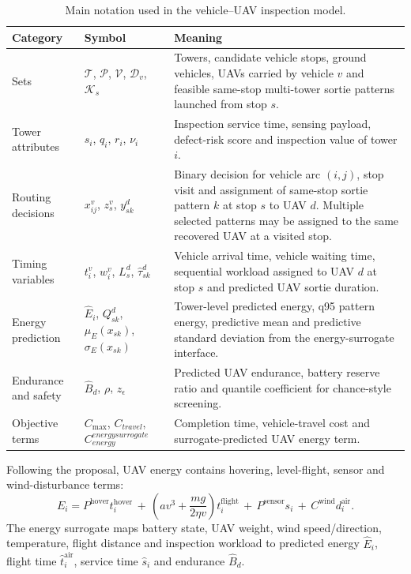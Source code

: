 \documentclass[preprint,12pt,number]{elsarticle}
\newcommand{\rev}[1]{{\color{blue}#1}}
\begin{document}
\begin{table}[t]
\centering
\caption{Main notation used in the vehicle--UAV inspection model.}
\label{tab:notation}
{\scriptsize
\setlength{\tabcolsep}{3pt}
\renewcommand{\arraystretch}{0.95}
\begin{tabularx}{\textwidth}{@{}llX@{}}
\toprule
Category & Symbol & Meaning \\
\midrule
Sets & $\mathcal{T}$, $\mathcal{P}$, $\mathcal{V}$, $\mathcal{D}_v$, $\mathcal{K}_s$ & \rev{Towers, candidate vehicle stops, ground vehicles, UAVs carried by vehicle $v$ and feasible same-stop multi-tower sortie patterns launched from stop $s$.} \\
Tower attributes & $s_i$, $q_i$, $r_i$, $\nu_i$ & Inspection service time, sensing payload, defect-risk score and inspection value of tower $i$. \\
Routing decisions & $x^v_{ij}$, $z_s^v$, $y^d_{sk}$ & \rev{Binary decision for vehicle arc $(i,j)$, stop visit and assignment of same-stop sortie pattern $k$ at stop $s$ to UAV $d$. Multiple selected patterns may be assigned to the same recovered UAV at a visited stop.} \\
Timing variables & $t_i^v$, $w_i^v$, $L_s^d$, $\hat\tau^d_{sk}$ & \rev{Vehicle arrival time, vehicle waiting time, sequential workload assigned to UAV $d$ at stop $s$ and predicted UAV sortie duration.} \\
Energy prediction & $\hat E_i$, $Q^d_{sk}$, $\mu_E(x_{sk})$, $\sigma_E(x_{sk})$ & \rev{Tower-level predicted energy, q95 pattern energy, predictive mean and predictive standard deviation from the energy-surrogate interface.} \\
Endurance and safety & $\hat B_d$, $\rho$, $z_\epsilon$ & Predicted UAV endurance, battery reserve ratio and quantile coefficient for chance-style screening. \\
Objective terms & $C_{\max}$, $C_{travel}$, $C^{energy surrogate}_{energy}$ & Completion time, vehicle-travel cost and surrogate-predicted UAV energy term. \\
\bottomrule
\end{tabularx}
}
\end{table}

Following the proposal, UAV energy contains hovering, level-flight, sensor and wind-disturbance terms:
\begin{equation}
E_i=P^{\mathrm{hover}}t_i^{\mathrm{hover}}
\,+\,\left(a v^3+\frac{m g}{2\eta v}\right)t_i^{\mathrm{flight}}
\,+\,P^{\mathrm{sensor}}s_i
\,+\,C^{\mathrm{wind}}d_i^{\mathrm{air}} .
\label{eq:energy}
\end{equation}
The energy surrogate maps battery state, UAV weight, wind speed/direction, temperature, flight distance and inspection workload to predicted energy $\hat E_i$, flight time $\hat t^{\mathrm{air}}_i$, service time $\hat s_i$ and endurance $\hat B_d$.
\end{document}
